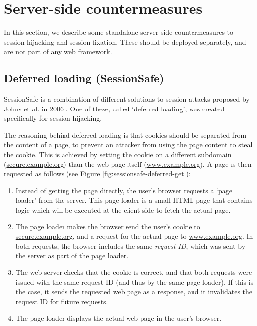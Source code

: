 \section{Server-side countermeasures}\label{standalone-server}

In this section, we describe some standalone server-side countermeasures to session hijacking and session fixation. These should be deployed separately, and are not part of any web framework.

\subsection{Deferred loading (SessionSafe)}

SessionSafe is a combination of different solutions to session attacks proposed by Johns et al. in 2006 \cite{Johns2006}. One of these, called `deferred loading', was created specifically for session hijacking.

The reasoning behind deferred loading is that cookies should be separated from the content of a page, to prevent an attacker from using the page content to steal the cookie. This is achieved by setting the cookie on a different subdomain (\url{secure.example.org}) than the web page itself (\url{www.example.org}). A page is then requested as follows (see Figure \ref{fig:sessionsafe-deferred-get}):
\begin{enumerate}
	\item Instead of getting the page directly, the user's browser requests a `page loader' from the server. This page loader is a small HTML page that contains logic which will be executed at the client side to fetch the actual page.
	\item The page loader makes the browser send the user's cookie to \url{secure.example.org}, and a request for the actual page to \url{www.example.org}. In both requests, the browser includes the same \emph{request ID}, which was sent by the server as part of the page loader.
	\item The web server checks that the cookie is correct, and that both requests were issued with the same request ID (and thus by the same page loader). If this is the case, it sends the requested web page as a response, and it invalidates the request ID for future requests.
	\item The page loader displays the actual web page in the user's browser.
\end{enumerate}

